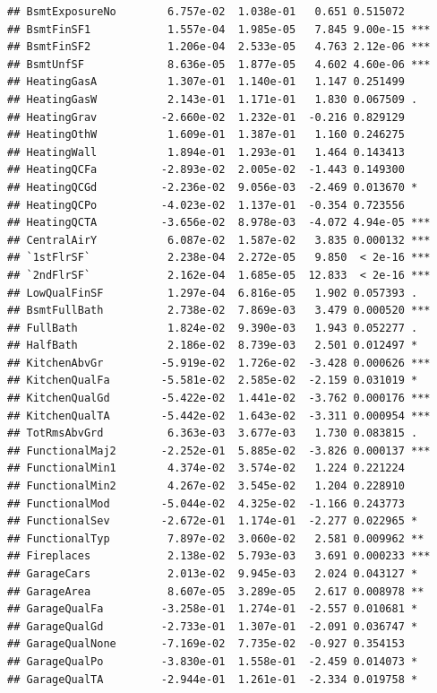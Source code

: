 \documentclass[american,]{article}
\theoremstyle{definition}
\theoremstyle{definition}
\theoremstyle{definition}
\theoremstyle{remark}
\begin{document}
\begin{verbatim}
## BsmtExposureNo        6.757e-02  1.038e-01   0.651 0.515072    
## BsmtFinSF1            1.557e-04  1.985e-05   7.845 9.00e-15 ***
## BsmtFinSF2            1.206e-04  2.533e-05   4.763 2.12e-06 ***
## BsmtUnfSF             8.636e-05  1.877e-05   4.602 4.60e-06 ***
## HeatingGasA           1.307e-01  1.140e-01   1.147 0.251499    
## HeatingGasW           2.143e-01  1.171e-01   1.830 0.067509 .  
## HeatingGrav          -2.660e-02  1.232e-01  -0.216 0.829129    
## HeatingOthW           1.609e-01  1.387e-01   1.160 0.246275    
## HeatingWall           1.894e-01  1.293e-01   1.464 0.143413    
## HeatingQCFa          -2.893e-02  2.005e-02  -1.443 0.149300    
## HeatingQCGd          -2.236e-02  9.056e-03  -2.469 0.013670 *  
## HeatingQCPo          -4.023e-02  1.137e-01  -0.354 0.723556    
## HeatingQCTA          -3.656e-02  8.978e-03  -4.072 4.94e-05 ***
## CentralAirY           6.087e-02  1.587e-02   3.835 0.000132 ***
## `1stFlrSF`            2.238e-04  2.272e-05   9.850  < 2e-16 ***
## `2ndFlrSF`            2.162e-04  1.685e-05  12.833  < 2e-16 ***
## LowQualFinSF          1.297e-04  6.816e-05   1.902 0.057393 .  
## BsmtFullBath          2.738e-02  7.869e-03   3.479 0.000520 ***
## FullBath              1.824e-02  9.390e-03   1.943 0.052277 .  
## HalfBath              2.186e-02  8.739e-03   2.501 0.012497 *  
## KitchenAbvGr         -5.919e-02  1.726e-02  -3.428 0.000626 ***
## KitchenQualFa        -5.581e-02  2.585e-02  -2.159 0.031019 *  
## KitchenQualGd        -5.422e-02  1.441e-02  -3.762 0.000176 ***
## KitchenQualTA        -5.442e-02  1.643e-02  -3.311 0.000954 ***
## TotRmsAbvGrd          6.363e-03  3.677e-03   1.730 0.083815 .  
## FunctionalMaj2       -2.252e-01  5.885e-02  -3.826 0.000137 ***
## FunctionalMin1        4.374e-02  3.574e-02   1.224 0.221224    
## FunctionalMin2        4.267e-02  3.545e-02   1.204 0.228910    
## FunctionalMod        -5.044e-02  4.325e-02  -1.166 0.243773    
## FunctionalSev        -2.672e-01  1.174e-01  -2.277 0.022965 *  
## FunctionalTyp         7.897e-02  3.060e-02   2.581 0.009962 ** 
## Fireplaces            2.138e-02  5.793e-03   3.691 0.000233 ***
## GarageCars            2.013e-02  9.945e-03   2.024 0.043127 *  
## GarageArea            8.607e-05  3.289e-05   2.617 0.008978 ** 
## GarageQualFa         -3.258e-01  1.274e-01  -2.557 0.010681 *  
## GarageQualGd         -2.733e-01  1.307e-01  -2.091 0.036747 *  
## GarageQualNone       -7.169e-02  7.735e-02  -0.927 0.354153    
## GarageQualPo         -3.830e-01  1.558e-01  -2.459 0.014073 *  
## GarageQualTA         -2.944e-01  1.261e-01  -2.334 0.019758 *  

\end{verbatim}
\end{document}
